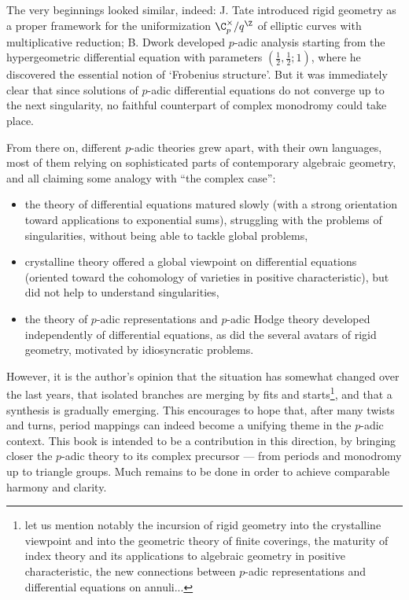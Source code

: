 The very beginnings looked similar, indeed: J. Tate introduced rigid
geometry as a proper framework for the uniformization $\C_p^\times/q^\Z$
of elliptic curves with multiplicative reduction; B. Dwork developed
$p$-adic analysis starting from the hypergeometric differential equation
with parameters $(\frac{1}{2},\frac{1}{2};1)$, where he discovered the
essential notion of `Frobenius structure'. But it was immediately clear
that since solutions of $p$-adic differential equations do not converge
up to the next singularity, no faithful counterpart of complex monodromy
could take place.

From there on, different $p$-adic theories grew apart, with their own
languages, most of them relying on sophisticated parts of contemporary
algebraic geometry, and all claiming some analogy with ``the complex
case'':

\begin{itemize}
 \renewcommand{\labelitemi}{\normalfont\bfseries\textendash}
 \item the theory of differential equations matured slowly (with a strong
       orientation toward applications to exponential sums), struggling with
       the problems of singularities, without being able to tackle global
       problems,
 \item crystalline theory offered a global viewpoint on differential
       equations (oriented toward the cohomology of varieties in positive
       characteristic), but did not help to understand singularities,
 \item the theory of $p$-adic representations and $p$-adic Hodge theory
       developed independently of differential equations, as did the several
       avatars of rigid geometry, motivated by idiosyncratic problems.
\end{itemize}


 \bigskip

However, it is the author's opinion that the situation has somewhat
changed over the last years, that isolated branches are merging by fits
and starts\footnote{let us mention notably the incursion of rigid
geometry into the crystalline viewpoint and into the geometric theory of
finite coverings, the maturity of index theory and its applications to
algebraic geometry in positive characteristic, the new connections
between $p$-adic representations and differential equations on
annuli...}, and that a synthesis is gradually emerging. This encourages
to hope that, after many twists and turns, period mappings can indeed
become a unifying theme in the $p$-adic context. This book is intended
to be a contribution in this direction, by bringing closer the $p$-adic
theory to its complex precursor --- from periods and monodromy up to
triangle groups. Much remains to be done in order to achieve comparable
harmony and clarity.

